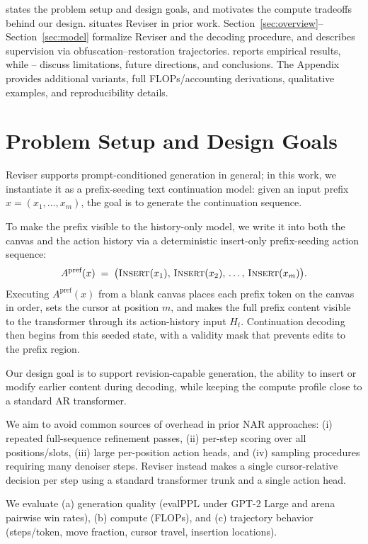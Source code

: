 \documentclass[11pt]{article}
\DeclareRobustCommand{\ph}[1]{#1}
\DeclareRobustCommand{\phA}{A}
\DeclareRobustCommand{\ph}[1]{\ifmmode\text{\phoenicianfont #1}\else{\phoenicianfont #1}\fi}
\DeclareRobustCommand{\phA}{\ph{\char"10900}} %
\DeclareRobustCommand{\ph}[1]{#1}
\DeclareRobustCommand{\phA}{A}
\DeclareRobustCommand{\Insert}{\ifmmode\text{\textsc{Insert}}\else\textsc{Insert}\fi}
\begin{document}
 states the problem setup and design goals, and  motivates the compute tradeoffs behind our design.  situates Reviser in prior work. Section~\ref{sec:overview}--Section~\ref{sec:model} formalize Reviser and the decoding procedure, and  describes supervision via obfuscation--restoration trajectories.  reports empirical results, while -- discuss limitations, future directions, and conclusions. The Appendix provides additional variants, full FLOPs/accounting derivations, qualitative examples, and reproducibility details.

\section{Problem Setup and Design Goals}
\label{sec:setup}

Reviser supports prompt-conditioned generation in general; in this work, we instantiate it as a prefix-seeding text continuation model: given an input prefix $x = (x_1,\dots,x_m)$, the goal is to generate the continuation sequence.

To make the prefix visible to the history-only model, we write it into both the canvas and the action history via a deterministic insert-only prefix-seeding action sequence:
\[
\phA^{\text{pref}}(x) \;=\; \bigl(\Insert(x_1),\,\Insert(x_2),\,\dots,\,\Insert(x_m)\bigr).
\]
Executing $\phA^{\text{pref}}(x)$ from a blank canvas places each prefix token on the canvas in order, sets the cursor at position $m$, and makes the full prefix content visible to the transformer through its action-history input $H_t$. Continuation decoding then begins from this seeded state, with a validity mask that prevents edits to the prefix region.

Our design goal is to support revision-capable generation, the ability to insert or modify earlier content during decoding, while keeping the compute profile close to a standard AR transformer.

We aim to avoid common sources of overhead in prior NAR approaches:
(i) repeated full-sequence refinement passes,
(ii) per-step scoring over all positions/slots,
(iii) large per-position action heads, and
(iv) sampling procedures requiring many denoiser steps.
Reviser instead makes a single cursor-relative decision per step using a standard transformer trunk and a single action head.

We evaluate (a) generation quality (evalPPL under GPT-2 Large and arena pairwise win rates), (b) compute (FLOPs), and (c) trajectory behavior (steps/token, move fraction, cursor travel, insertion locations).
\end{document}
